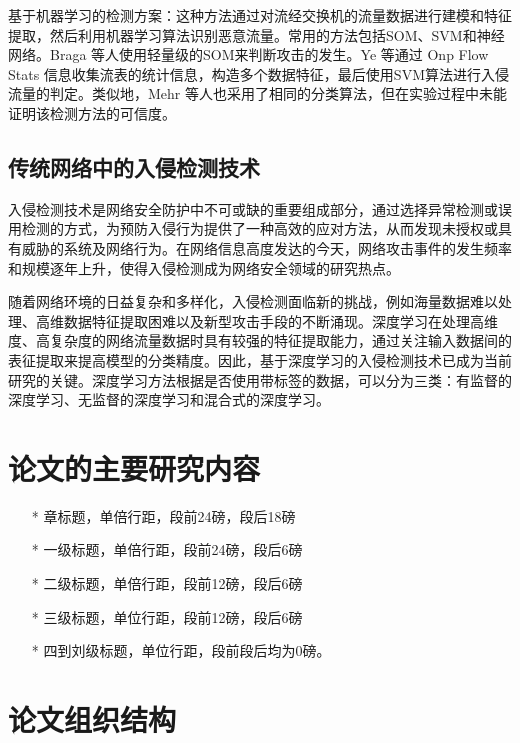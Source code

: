 基于机器学习的检测方案：这种方法通过对流经交换机的流量数据进行建模和特征提取，然后利用机器学习算法识别恶意流量。常用的方法包括SOM、SVM和神经网络。Braga 等人使用轻量级的SOM来判断攻击的发生。Ye 等通过 Onp Flow Stats 信息收集流表的统计信息，构造多个数据特征，最后使用SVM算法进行入侵流量的判定。类似地，Mehr 等人也采用了相同的分类算法，但在实验过程中未能证明该检测方法的可信度。
\subsection{传统网络中的入侵检测技术}
入侵检测技术是网络安全防护中不可或缺的重要组成部分，通过选择异常检测或误用检测的方式，为预防入侵行为提供了一种高效的应对方法，从而发现未授权或具有威胁的系统及网络行为。在网络信息高度发达的今天，网络攻击事件的发生频率和规模逐年上升，使得入侵检测成为网络安全领域的研究热点。

随着网络环境的日益复杂和多样化，入侵检测面临新的挑战，例如海量数据难以处理、高维数据特征提取困难以及新型攻击手段的不断涌现。深度学习在处理高维度、高复杂度的网络流量数据时具有较强的特征提取能力，通过关注输入数据间的表征提取来提高模型的分类精度。因此，基于深度学习的入侵检测技术已成为当前研究的关键。深度学习方法根据是否使用带标签的数据，可以分为三类：有监督的深度学习、无监督的深度学习和混合式的深度学习。
\section{论文的主要研究内容}

\begin{enumerate}
    \item [*]章标题，单倍行距，段前24磅，段后18磅
    \item [*]一级标题，单倍行距，段前24磅，段后6磅
    \item [*]二级标题，单倍行距，段前12磅，段后6磅
    \item [*]三级标题，单位行距，段前12磅，段后6磅
    \item [*]四到刘级标题，单位行距，段前段后均为0磅。
\end{enumerate}

\section{论文组织结构}